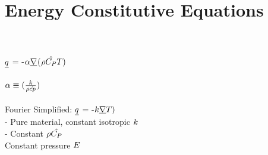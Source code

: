 \section{Energy Constitutive Equations}

\begin{mdframed}
     \\
    \\
     $\underline{\heatflux}$ = -$\tdiff\gradop$($\dens\hat{\cp}\Temp)$ \\
    \\
     $\tdiff \equiv (\frac{\thermcond}{\dens\hat{cp}})$\\
    \\
    Fourier Simplified: $\underline{\heatflux}$ = -$\thermcond\gradop\Temp)$\\
    - Pure material, constant isotropic $\thermcond$\\
    - Constant $\dens\hat{\cp}$\\
    Constant pressure 
    $\energy$
    
\end{mdframed}